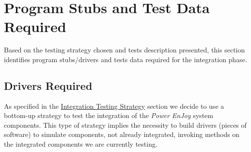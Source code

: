\section{Program Stubs and Test Data Required}
Based on the testing strategy chosen and tests description presented, this section identifies program stubs/drivers and tests data required for the integration phase.

\subsection{Drivers Required}
As specified in the \hyperref[sec:intStrategy]{Integration Testing Strategy} section we decide to use a bottom-up strategy to test the integration of the \emph{Power EnJoy} system components. This type of strategy implies the necessity to build drivers (pieces of software) to simulate components, not already integrated, invoking methods on the integrated components we are currently testing. \\

